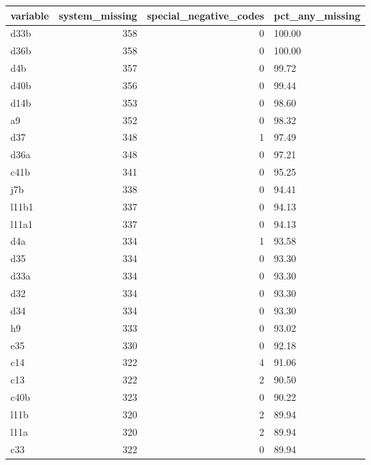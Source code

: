 \begin{tabular}{lrrl}
\toprule
variable & system\_missing & special\_negative\_codes & pct\_any\_missing \\
\midrule
d33b & 358 & 0 & 100.00 \\
d36b & 358 & 0 & 100.00 \\
d4b & 357 & 0 & 99.72 \\
d40b & 356 & 0 & 99.44 \\
d14b & 353 & 0 & 98.60 \\
a9 & 352 & 0 & 98.32 \\
d37 & 348 & 1 & 97.49 \\
d36a & 348 & 0 & 97.21 \\
c41b & 341 & 0 & 95.25 \\
j7b & 338 & 0 & 94.41 \\
l11b1 & 337 & 0 & 94.13 \\
l11a1 & 337 & 0 & 94.13 \\
d4a & 334 & 1 & 93.58 \\
d35 & 334 & 0 & 93.30 \\
d33a & 334 & 0 & 93.30 \\
d32 & 334 & 0 & 93.30 \\
d34 & 334 & 0 & 93.30 \\
h9 & 333 & 0 & 93.02 \\
e35 & 330 & 0 & 92.18 \\
c14 & 322 & 4 & 91.06 \\
c13 & 322 & 2 & 90.50 \\
c40b & 323 & 0 & 90.22 \\
l11b & 320 & 2 & 89.94 \\
l11a & 320 & 2 & 89.94 \\
c33 & 322 & 0 & 89.94 \\
\bottomrule
\end{tabular}

